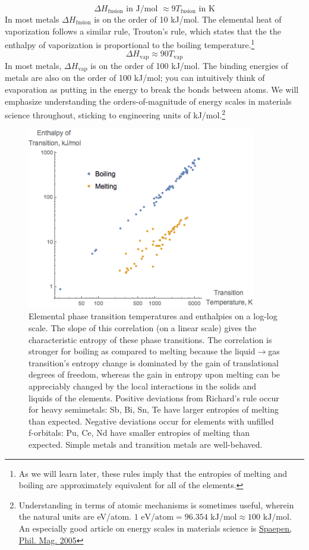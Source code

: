 \documentclass[12pt]{article}
\begin{document}
\begin{equation}
\Delta H_\text{fusion} \text{ in J/mol } \approx 9 T_\text{fusion} \text{ in K}
\end{equation}
In most metals $\Delta H_\text{fusion}$ is on the order of 10 kJ/mol.  The elemental heat of vaporization follows a similar rule, Trouton's rule, which states that the the enthalpy of vaporization is proportional to the boiling temperature.\footnote{As we will learn later, these rules imply that the entropies of melting and boiling are approximately equivalent for all of the elements.}
\begin{equation}
\Delta H_\text{vap} \approx 90 T_\text{vap}
\end{equation}
In most metals,  $\Delta H_\text{vap}$ is on the order of 100 kJ/mol.  The binding energies of metals are also on the order of 100 kJ/mol; you can intuitively think of evaporation as putting in the energy to break the bonds between atoms. We will emphasize understanding the orders-of-magnitude of energy scales in materials science throughout, sticking to engineering units of kJ/mol.\footnote{Understanding in terms of atomic mechanisms is sometimes useful, wherein the natural units are eV/atom. $1 \text{ eV/atom}= 96.354\text{ kJ/mol}\approx 100\text{ kJ/mol}$. An especially good article on energy scales in materials science is  \href{http://dx.doi.org/10.1080/14786430500155080}{Spaepen, Phil. Mag. 2005}}

\begin{figure}[h]
\centering
\label{Trouton_Richard}
\includegraphics[width = 10cm]{Trouton_and_Richards_rules.png}
\caption{Elemental phase transition temperatures and enthalpies on a log-log scale. The slope of this correlation (on a linear scale) gives the characteristic entropy of these phase transitions. The correlation is stronger for boiling as compared to melting because the liquid$\to$gas transition's entropy change is dominated by the gain of translational degrees of freedom, whereas the gain in entropy upon melting can be appreciably changed by the local interactions in the solids and liquids of the elements. Positive deviations from Richard's rule occur for heavy semimetals: Sb, Bi, Sn, Te have larger entropies of melting than expected. Negative deviations occur for elements with unfilled f-orbitals: Pu, Ce, Nd have smaller entropies of melting than expected. Simple metals and transition metals are well-behaved.}
\end{figure}
\end{document}
